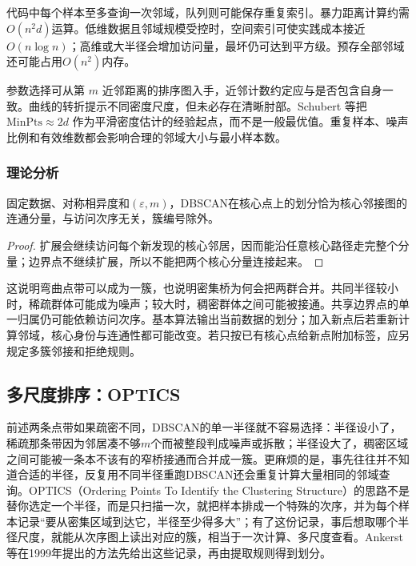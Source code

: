 代码中每个样本至多查询一次邻域，队列则可能保存重复索引。暴力距离计算约需$O(n^2d)$运算。低维数据且邻域规模受控时，空间索引可使实践成本接近$O(n\log n)$；高维或大半径会增加访问量，最坏仍可达到平方级。预存全部邻域还可能占用$O(n^2)$内存。

参数选择可从第 $m$ 近邻距离的排序图入手，近邻计数约定应与是否包含自身一致。曲线的转折提示不同密度尺度，但未必存在清晰肘部。Schubert 等把 $\mathrm{MinPts}\approx 2d$ 作为平滑密度估计的经验起点，而不是一般最优值。重复样本、噪声比例和有效维数都会影响合理的邻域大小与最小样本数。

\subsubsection{理论分析}

\begin{lemma}[DBSCAN的核心点划分]
 \label{thm:clustering-dbscan}
 固定数据、对称相异度和$(\varepsilon,m)$，DBSCAN在核心点上的划分恰为核心邻接图的连通分量，与访问次序无关，簇编号除外。
\end{lemma}
\begin{proof}
扩展会继续访问每个新发现的核心邻居，因而能沿任意核心路径走完整个分量；边界点不继续扩展，所以不能把两个核心分量连接起来。
\end{proof}

这说明弯曲点带可以成为一簇，也说明密集桥为何会把两群合并。共同半径较小时，稀疏群体可能成为噪声；较大时，稠密群体之间可能被接通。共享边界点的单一归属仍可能依赖访问次序。基本算法输出当前数据的划分；加入新点后若重新计算邻域，核心身份与连通性都可能改变。若只按已有核心点给新点附加标签，应另规定多簇邻接和拒绝规则。
\subsection{多尺度排序：OPTICS}
\label{sec:clustering-optics}

前述两条点带如果疏密不同，DBSCAN的单一半径就不容易选择：半径设小了，稀疏那条带因为邻居凑不够$m$个而被整段判成噪声或拆散；半径设大了，稠密区域之间可能被一条本不该有的窄桥接通而合并成一簇。更麻烦的是，事先往往并不知道合适的半径，反复用不同半径重跑DBSCAN还会重复计算大量相同的邻域查询。OPTICS（Ordering Points To Identify the Clustering Structure）的思路不是替你选定一个半径，而是只扫描一次，就把样本排成一个特殊的次序，并为每个样本记录“要从密集区域到达它，半径至少得多大”；有了这份记录，事后想取哪个半径尺度，就能从次序图上读出对应的簇，相当于一次计算、多尺度查看。Ankerst等在1999年提出的方法先给出这些记录，再由提取规则得到划分。

